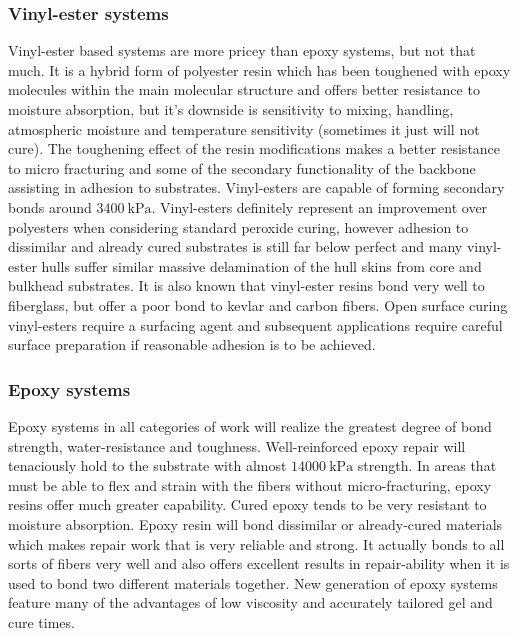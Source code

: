 \subsubsection{Vinyl-ester systems}\label{subsec:vinyl_ester}
Vinyl-ester based systems are more pricey than epoxy systems, but not that much. It is a hybrid form of polyester resin which has been toughened with epoxy molecules within the main molecular structure and offers better resistance to moisture absorption, but it's downside is sensitivity to mixing, handling, atmospheric moisture and temperature sensitivity (sometimes it just will not cure). The toughening effect of the resin modifications makes a better resistance to micro fracturing and some of the secondary functionality of the backbone assisting in adhesion to substrates. Vinyl-esters are capable of forming secondary bonds around $3400~\mathrm{kPa}$. Vinyl-esters definitely represent an improvement over polyesters when considering standard peroxide curing, however adhesion to dissimilar and already cured substrates is still far below perfect and many vinyl-ester hulls suffer similar massive delamination of the hull skins from core and bulkhead substrates. It is also known that vinyl-ester resins bond very well to fiberglass, but offer a poor bond to kevlar and carbon fibers.  Open surface curing vinyl-esters require a surfacing agent and subsequent applications require careful surface preparation if reasonable adhesion is to be achieved.

\subsubsection{Epoxy systems}\label{subsec:epoxy_systems}
Epoxy systems in all categories of work will realize the greatest degree of bond strength, water-resistance and toughness. Well-reinforced epoxy repair will tenaciously hold to the substrate with almost $14 000~\mathrm{kPa}$ strength. In areas that must be able to flex and strain with the fibers without micro-fracturing, epoxy resins offer much greater capability. Cured epoxy tends to be very resistant to moisture absorption. Epoxy resin will bond dissimilar or already-cured materials which makes repair work that is  very reliable and strong. It actually bonds to all sorts of fibers very well and also offers excellent results in repair-ability when it is used to bond two different materials together. New generation of epoxy systems feature many of the advantages of low viscosity and accurately tailored gel and cure times. 

